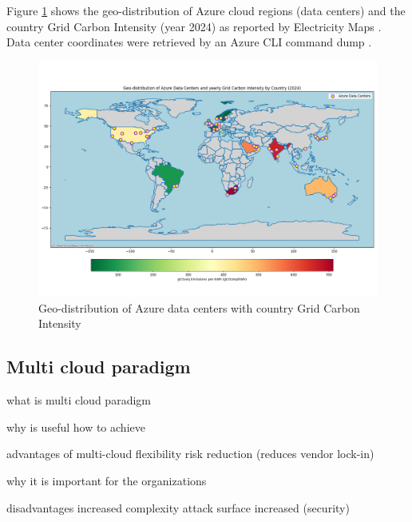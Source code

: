Figure \ref{fig:azure_data_centers} shows the geo-distribution of Azure cloud regions (data centers) and the country Grid Carbon Intensity (year 2024) as reported by Electricity Maps \cite{electricity_maps}. Data center coordinates were retrieved by an Azure CLI command dump \cite{azure_data_centers_information}.

\begin{figure}[htbp]
    \centering
    \includegraphics[width=1\linewidth]{images/azure_data_centers.png}
    \caption{Geo-distribution of Azure data centers with country Grid Carbon Intensity}
    \label{fig:azure_data_centers}
\end{figure}



\subsection{Multi cloud paradigm}

what is multi cloud paradigm

why is useful
how to achieve

advantages of multi-cloud
flexibility
risk reduction (reduces vendor lock-in)

why it is important for the organizations


disadvantages
increased complexity
attack surface increased (security)




